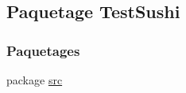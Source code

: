 \hypertarget{namespaceTestSushi}{}\subsection{Paquetage Test\+Sushi}
\label{namespaceTestSushi}
\subsubsection*{Paquetages}
\begin{DoxyCompactItemize}
\item 
package \hyperlink{namespaceTestSushi_1_1src}{src}
\end{DoxyCompactItemize}

